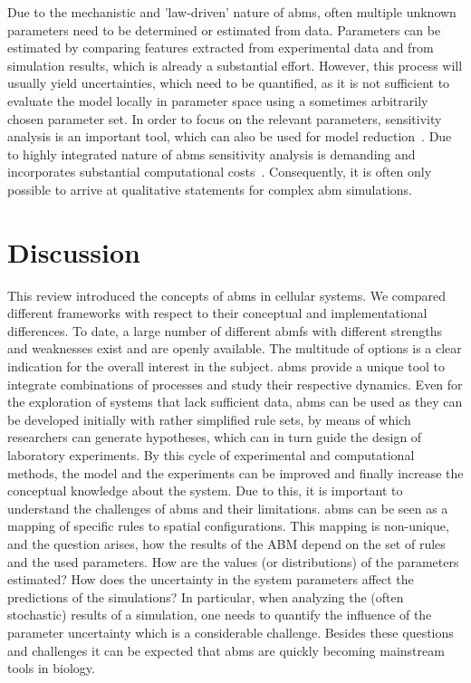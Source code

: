 %
Due to the mechanistic and 'law-driven' nature of \acp{abm}, often multiple unknown
parameters need to be determined or estimated from data.
Parameters can be estimated by comparing features extracted from experimental data and
from simulation results, which is already a substantial effort.
However, this process will usually yield uncertainties, which need to be quantified, as
it is not sufficient to evaluate the model locally in parameter space using a sometimes
arbitrarily chosen parameter set.
In order to focus on the relevant parameters, sensitivity analysis is an important tool,
which can also be used for model reduction~\cite{Saltelli2008}.
Due to highly integrated nature of \acp{abm} sensitivity analysis is demanding and
incorporates substantial computational costs~\cite{Aguilar2020}.
Consequently, it is often only possible to arrive at qualitative statements for complex
\ac{abm} simulations.

\section{Discussion}
\label{sec:discussion}\noindent
This review introduced the concepts of \aclp{abm} in cellular systems.
We compared different frameworks with respect to their conceptual and implementational differences.
To date, a large number of different \aclp{abmf} with different strengths and weaknesses
exist and are openly available.
The multitude of options is a clear indication for the overall interest in the subject.
\acp{abm} provide a unique tool to integrate combinations of processes and study their
respective dynamics.
Even for the exploration of systems that lack sufficient data, \acp{abm} can be used as
they can be developed initially with rather simplified rule sets, by means of which
researchers can generate hypotheses, which can in turn guide the design of laboratory experiments.
By this cycle of experimental and computational methods, the model and the experiments
can be improved and finally increase the conceptual knowledge about the system.
Due to this, it is important to understand the challenges of \acp{abm} and their limitations.
\acp{abm} can be seen as a mapping of specific rules to spatial configurations.
This mapping is non-unique, and the question arises, how the results of the ABM depend on
the set of rules and the used parameters.
How are the values (or distributions) of the parameters estimated? How does the
uncertainty in the system parameters affect the predictions of the simulations? In
particular, when analyzing the (often stochastic) results of a simulation, one needs to
quantify the influence of the parameter uncertainty which is a considerable challenge.
Besides these questions and challenges it can be expected that \acp{abm} are quickly
becoming mainstream tools in biology.

